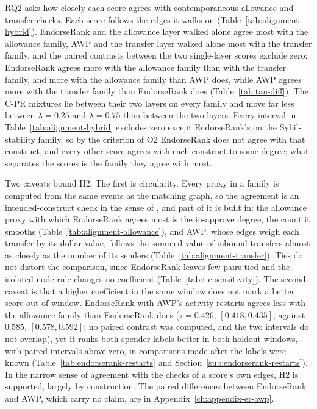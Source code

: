 
RQ2 asks how closely each score agrees with contemporaneous allowance and transfer checks. Each score follows the edges it walks on (Table~\ref{tab:alignment-hybrid}). EndorseRank and the allowance layer walked alone agree most with the allowance family, AWP and the transfer layer walked alone most with the transfer family, and the paired contrasts between the two single-layer scores exclude zero: EndorseRank agrees more with the allowance family than with the transfer family, and more with the allowance family than AWP does, while AWP agrees more with the transfer family than EndorseRank does (Table~\ref{tab:tau-diff}). The C-PR mixtures lie between their two layers on every family and move far less between $\lambda=0.25$ and $\lambda=0.75$ than between the two layers. Every interval in Table~\ref{tab:alignment-hybrid} excludes zero except EndorseRank's on the Sybil-stability family, so by the criterion of O2 EndorseRank does not agree with that construct, and every other score agrees with each construct to some degree; what separates the scores is the family they agree with most.

Two caveats bound H2. The first is circularity. Every proxy in a family is computed from the same events as the matching graph, so the agreement is an intended-construct check in the sense of \textcite{cronbach1955construct}, and part of it is built in: the allowance proxy with which EndorseRank agrees most is the in-approve degree, the count it smooths (Table~\ref{tab:alignment-allowance}), and AWP, whose edges weigh each transfer by its dollar value, follows the summed value of inbound transfers almost as closely as the number of its senders (Table~\ref{tab:alignment-transfer}). Ties do not distort the comparison, since EndorseRank leaves few pairs tied and the isolated-node rule changes no coefficient (Table~\ref{tab:tie-sensitivity}). The second caveat is that a higher coefficient in the same window does not mark a better score out of window. EndorseRank with AWP's activity restarts agrees less with the allowance family than EndorseRank does ($\tau=0.426$, $[0.418,0.435]$, against $0.585$, $[0.578,0.592]$; no paired contrast was computed, and the two intervals do not overlap), yet it ranks both spender labels better in both holdout windows, with paired intervals above zero, in comparisons made after the labels were known (Table~\ref{tab:endorserank-restarts} and Section~\ref{sub:endorserank-restarts}). In the narrow sense of agreement with the checks of a score's own edges, H2 is supported, largely by construction. The paired differences between EndorseRank and AWP, which carry no claim, are in Appendix~\ref{ch:appendix-er-awp}.

